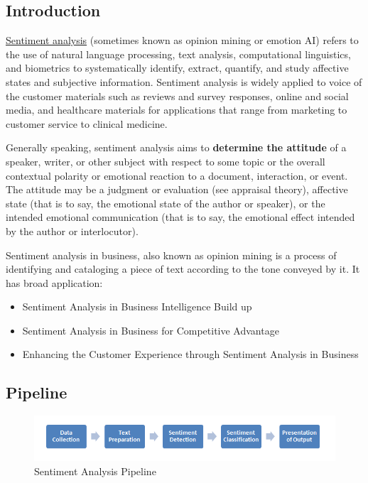 \documentclass[letterpaper,11pt,english]{sphinxmanual}
\begin{document}
\subsection{Introduction}
\label{textmining:id1}
\href{https://en.wikipedia.org/wiki/Sentiment\_analysis}{Sentiment analysis} (sometimes known as opinion mining or emotion AI) refers to the use of natural language processing, text analysis, computational linguistics, and biometrics to systematically identify, extract, quantify, and study affective states and subjective information. Sentiment analysis is widely applied to voice of the customer materials such as reviews and survey responses, online and social media, and healthcare materials for applications that range from marketing to customer service to clinical medicine.

Generally speaking, sentiment analysis aims to \textbf{determine the attitude} of a speaker, writer, or other subject with respect to some topic or the overall contextual polarity or emotional reaction to a document, interaction, or event. The attitude may be a judgment or evaluation (see appraisal theory), affective state (that is to say, the emotional state of the author or speaker), or the intended emotional communication (that is to say, the emotional effect intended by the author or interlocutor).

Sentiment analysis in business, also known as opinion mining is a process of identifying and cataloging a piece of text according to the tone conveyed by it. It has broad application:
\begin{itemize}
\item {} 
Sentiment Analysis in Business Intelligence Build up

\item {} 
Sentiment Analysis in Business for Competitive Advantage

\item {} 
Enhancing the Customer Experience through Sentiment Analysis in Business

\end{itemize}


\subsection{Pipeline}
\label{textmining:pipeline}\begin{figure}[htbp]
\centering
\capstart

\includegraphics{sentiment_analysis_pipeline.png}
\caption{Sentiment Analysis Pipeline}\label{textmining:fig-sa-pipeline}\end{figure}
\end{document}
